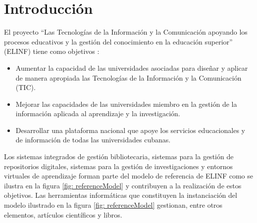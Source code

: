 %
\chapter*{\large Introducción}

\pagestyle{fancy}
\renewcommand{\sectionmark}[1]{\markright{#1}}

\lhead{}
\chead{}
\lfoot{}
\cfoot{}
\rfoot{\thepage}
\renewcommand{\headrulewidth}{0.4pt}

 \def\bibname{\large Introducción}

\pagestyle{fancy}
\lhead{}
\chead{}
\lfoot{}
\cfoot{}
\rfoot{\thepage}
\renewcommand{\headrulewidth}{0.4pt}
\vspace{-1cm}

El proyecto ``Las Tecnologías de la Información y la Comunicación apoyando los procesos educativos y la gestión del conocimiento en la educación superior'' (ELINF) tiene como objetivos \citep{Ciudad-Ricardo2017}:

\begin{itemize}
\item Aumentar la capacidad de las universidades asociadas para diseñar y aplicar de manera apropiada las Tecnologías de la Información y la Comunicación (TIC).
\item Mejorar las capacidades de las universidades miembro en la gestión de la información aplicada al aprendizaje y la investigación.
\item Desarrollar una plataforma nacional que apoye los servicios educacionales y de información de todas las universidades cubanas.
\end{itemize}

Los sistemas integrados de gestión bibliotecaria, sistemas para la gestión de repositorios digitales, sistemas para la gestión de investigaciones y entornos virtuales de aprendizaje forman parte del modelo de referencia de ELINF como se ilustra en la figura \ref{fig: referenceModel} y contribuyen a la realización de estos objetivos. Las herramientas informáticas que constituyen la instanciación del modelo ilustrado en la figura \ref{fig: referenceModel} gestionan, entre otros elementos, artículos científicos y libros.

